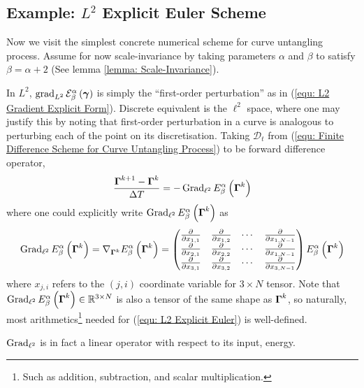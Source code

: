 \documentclass[../dissertation.tex]{subfiles}
\begin{document}
\subsection{Example: $L^2$ Explicit Euler Scheme}
Now we visit the simplest concrete numerical scheme for curve untangling process.
Assume for now scale-invariance by taking parameters $\alpha$ and $\beta$ to satisfy $\beta = \alpha+2$ (See lemma \ref{lemma: Scale-Invariance}).

In $L^2$, $\operatorname{grad}_{L^2} \mathcal{E}_{\beta}^{\alpha} \left( \boldsymbol{\gamma} \right)$ is simply the ``first-order perturbation'' as in (\ref{equ: L2 Gradient Explicit Form}).
Discrete equivalent is the $\ell^2$ space,
where one may justify this by noting that first-order perturbation in a curve is analogous to perturbing each of the point on its discretisation.
Taking $\mathcal{D}_t$ from (\ref{equ: Finite Difference Scheme for Curve Untangling Process}) to be forward difference operator,
\begin{equation}
    \frac{\boldsymbol{\Gamma}^{k+1} - \boldsymbol{\Gamma}^k}{\Delta T} = - \operatorname{Grad}_{\ell^2} E_{\beta}^{\alpha} \left( \boldsymbol{\Gamma}^k \right)
    \label{equ: L2 Explicit Euler}
\end{equation}
where one could explicitly write $\operatorname{Grad}_{\ell^2} E_{\beta}^\alpha \left( \boldsymbol{\Gamma}^k \right)$ as
\begin{equation}
    \operatorname{Grad}_{\ell^2} E_{\beta}^\alpha \left( \boldsymbol{\Gamma}^k \right)
    =
    \nabla_{\boldsymbol{\Gamma}^k} E_{\beta}^\alpha \left( \boldsymbol{\Gamma}^k \right)
    =
    \begin{pmatrix}
        \frac{\partial}{\partial x_{1,1}} & \frac{\partial}{\partial x_{1,2}} & \cdots & \frac{\partial}{\partial x_{1,N-1}} \\
        \frac{\partial}{\partial x_{2,1}} & \frac{\partial}{\partial x_{2,2}} & \cdots & \frac{\partial}{\partial x_{1,N-1}} \\
        \frac{\partial}{\partial x_{3,1}} & \frac{\partial}{\partial x_{3,2}} & \cdots & \frac{\partial}{\partial x_{3,N-1}}
    \end{pmatrix}
    E_{\beta}^{\alpha} \left( \boldsymbol{\Gamma}^k \right)
    \label{equ: Gradient in l2}
\end{equation}
where $x_{j,i}$ refers to the $\left( j,i \right)$ coordinate variable for $3 \times N$ tensor.
Note that $\operatorname{Grad}_{\ell^2} E_{\beta}^\alpha \left( \boldsymbol{\Gamma}^k \right) \in \mathbb{R}^{3 \times N}$ is also a tensor of the same shape as $\boldsymbol{\Gamma}^k$,
so naturally, most arithmetics\footnote{Such as addition, subtraction, and scalar multiplication.} needed for (\ref{equ: L2 Explicit Euler}) is well-defined.
\begin{remark}
    $\operatorname{Grad}_{\ell^2}$ is in fact a linear operator with respect to its input, energy.
\end{remark}
\end{document}
